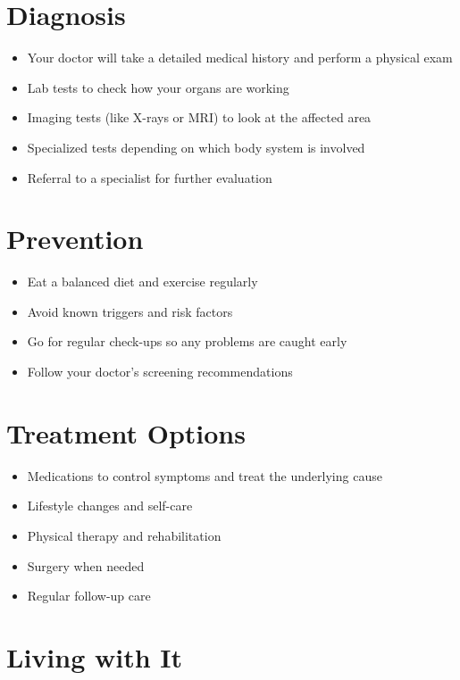 \section{Diagnosis}

\begin{itemize}[noitemsep]
  \item Your doctor will take a detailed medical history and perform a physical exam
  \item Lab tests to check how your organs are working
  \item Imaging tests (like X-rays or MRI) to look at the affected area
  \item Specialized tests depending on which body system is involved
  \item Referral to a specialist for further evaluation
\end{itemize}

\section{Prevention}

\begin{itemize}[noitemsep]
  \item Eat a balanced diet and exercise regularly
  \item Avoid known triggers and risk factors
  \item Go for regular check-ups so any problems are caught early
  \item Follow your doctor's screening recommendations
\end{itemize}

\section{Treatment Options}

\begin{itemize}[noitemsep]
  \item Medications to control symptoms and treat the underlying cause
  \item Lifestyle changes and self-care
  \item Physical therapy and rehabilitation
  \item Surgery when needed
  \item Regular follow-up care
\end{itemize}

\section{Living with It}

